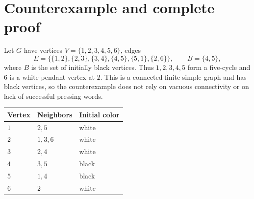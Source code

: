 \documentclass[11pt]{article}
\begin{document}
\section{Counterexample and complete proof}
Let $G$ have vertices $V=\{1,2,3,4,5,6\}$, edges
\[
 E=\bigl\{\{1,2\},\{2,3\},\{3,4\},\{4,5\},\{5,1\},\{2,6\}\bigr\},
 \qquad B=\{4,5\},
\]
where $B$ is the set of initially black vertices. Thus $1,2,3,4,5$ form a
five-cycle and $6$ is a white pendant vertex at $2$. This is a connected
finite simple graph and has black vertices, so the counterexample does
not rely on vacuous connectivity or on lack of successful pressing words.

\begin{center}
\begin{tabular}{lll}
\toprule
Vertex & Neighbors & Initial color\\
\midrule
$1$ & $2,5$ & white\\
$2$ & $1,3,6$ & white\\
$3$ & $2,4$ & white\\
$4$ & $3,5$ & black\\
$5$ & $1,4$ & black\\
$6$ & $2$ & white\\
\bottomrule
\end{tabular}
\end{center}
\end{document}
